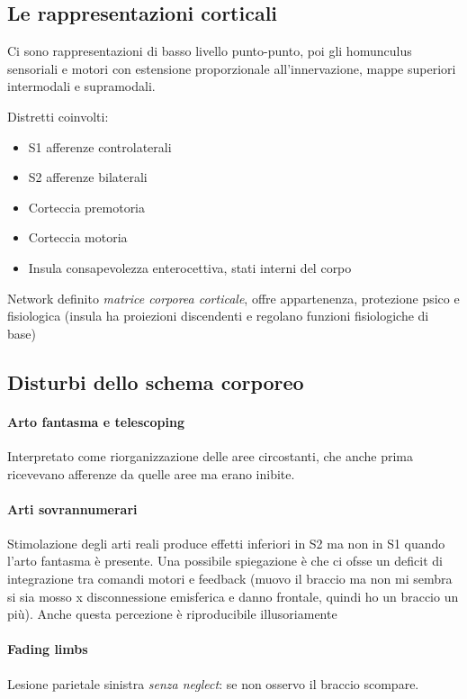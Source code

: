 \documentclass[12pt, a4paper]{article}
\begin{document}
\subsection{Le rappresentazioni corticali}

Ci sono rappresentazioni di basso livello punto-punto, poi gli homunculus sensoriali e motori con estensione proporzionale all'innervazione, mappe superiori intermodali e supramodali.

Distretti coinvolti:

\begin{itemize}
    \item S1 afferenze controlaterali
    \item S2 afferenze bilaterali
    \item Corteccia premotoria
    \item Corteccia motoria
    \item Insula consapevolezza enterocettiva, stati interni del corpo
\end{itemize}

Network definito \emph{matrice corporea corticale}, offre appartenenza, protezio\-ne psico e fisiologica (insula ha proiezioni discendenti e regolano funzioni fisiologiche di base)

\subsection{Disturbi dello schema corporeo}

\paragraph{Arto fantasma e telescoping} Interpretato come riorganizzazione delle aree circostanti, che anche prima ricevevano afferenze da quelle aree ma erano inibite.

\paragraph{Arti sovrannumerari} Stimolazione degli arti reali produce effetti inferiori in S2 ma non in S1 quando l'arto fantasma è presente.
Una possibile spiegazione è che ci ofsse un deficit di integrazione tra comandi motori e feedback (muovo il braccio ma non mi sembra si sia mosso x disconnessione emisferica e danno frontale, quindi ho un braccio un più).
Anche questa percezione è riproducibile illusoriamente

\paragraph{Fading limbs}  Lesione parietale sinistra \emph{senza neglect}: se non osservo il braccio scompare.
\end{document}
